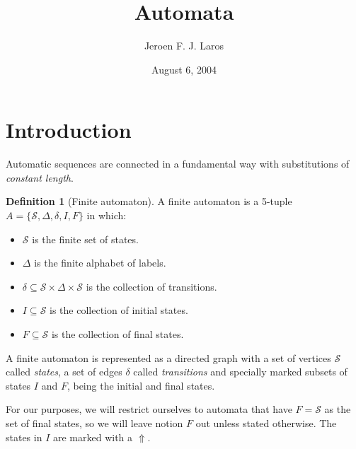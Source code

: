 \documentclass{article}
\title{Automata}
\author{Jeroen F. J. Laros}
\date{August 6, 2004}
\begin{document}
\renewcommand{\qedsymbol}{$\blacksquare$}
\newcommand{\bs}{\begin{small}}
\newcommand{\es}{\end{small}}
\newcommand{\bS}{\begin{tiny}}
\newcommand{\eS}{\end{tiny}}
\newcommand{\monoit}[1]{\texttt{\textit{#1}}}

\newtheorem{theorem}{Theorem}[subsection]
\newtheorem{lemma}[theorem]{Lemma}
\newtheorem{corollary}[theorem]{Corollary}

\theoremstyle{definition}
\newtheorem{example}[theorem]{Example}
\newtheorem{definition}[theorem]{Definition}
\newtheorem{remark}[theorem]{Remark}

\maketitle

\section{Introduction}
Automatic sequences are connected in a fundamental way with substitutions of
\emph{constant length}.

\begin{definition}[Finite automaton] \label{def:finite_automaton}
A finite automaton is a 5-tuple $A = \{\mathcal{S}, \Delta, \delta, I, F\}$
in which:
\begin{itemize}
\item $\mathcal{S}$ is the finite set of states.
\item $\Delta$ is the finite alphabet of labels.
\item $\delta \subseteq \mathcal{S} \times \Delta \times \mathcal{S}$ is the 
      collection of transitions.
\item $I \subseteq \mathcal{S}$ is the collection of initial states.
\item $F \subseteq \mathcal{S}$ is the collection of final states.
\end{itemize}
\end{definition}

A finite automaton is represented as a directed graph with a set of vertices
$\mathcal{S}$ called \emph{states}, a set of edges $\delta$ called 
\emph{transitions}
and specially marked subsets of states $I$ and $F$, being the initial and final
states.

For our purposes, we will restrict ourselves to automata that have
$F = \mathcal{S}$ as the set of final states, so we will leave notion $F$
out unless stated otherwise. The states in $I$ are marked with a $\Uparrow$.
\end{document}
